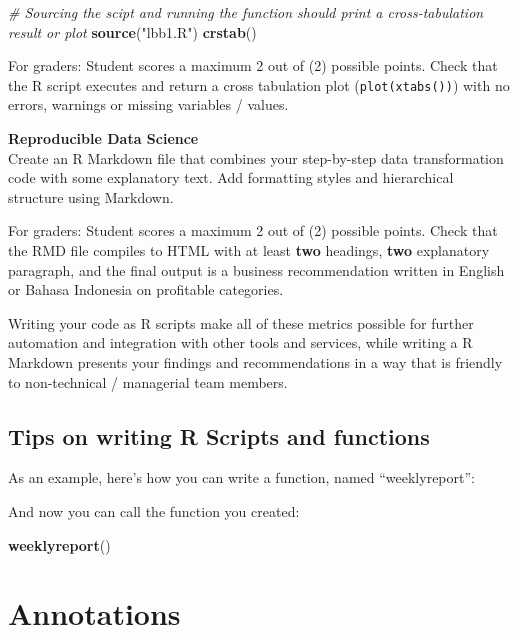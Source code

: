\documentclass[]{article}
\newenvironment{Shaded}{\begin{snugshade}}{\end{snugshade}}
\newcommand{\CommentTok}[1]{\textcolor[rgb]{0.56,0.35,0.01}{\textit{#1}}}
\newcommand{\ControlFlowTok}[1]{\textcolor[rgb]{0.13,0.29,0.53}{\textbf{#1}}}
\newcommand{\KeywordTok}[1]{\textcolor[rgb]{0.13,0.29,0.53}{\textbf{#1}}}
\newcommand{\NormalTok}[1]{#1}
\newcommand{\OperatorTok}[1]{\textcolor[rgb]{0.81,0.36,0.00}{\textbf{#1}}}
\newcommand{\StringTok}[1]{\textcolor[rgb]{0.31,0.60,0.02}{#1}}
\begin{document}
\begin{Shaded}
\begin{Highlighting}[]
\CommentTok{# Sourcing the scipt and running the function should print a cross-tabulation result or plot}
\KeywordTok{source}\NormalTok{(}\StringTok{"lbb1.R"}\NormalTok{)}
\KeywordTok{crstab}\NormalTok{()}
\end{Highlighting}
\end{Shaded}

For graders: Student scores a maximum 2 out of (2) possible points.
Check that the R script executes and return a cross tabulation plot
(\texttt{plot(xtabs())}) with no errors, warnings or missing variables /
values.

\textbf{Reproducible Data Science}\\
Create an R Markdown file that combines your step-by-step data
transformation code with some explanatory text. Add formatting styles
and hierarchical structure using Markdown.

For graders: Student scores a maximum 2 out of (2) possible points.
Check that the RMD file compiles to HTML with at least \textbf{two}
headings, \textbf{two} explanatory paragraph, and the final output is a
business recommendation written in English or Bahasa Indonesia on
profitable categories.

Writing your code as R scripts make all of these metrics possible for
further automation and integration with other tools and services, while
writing a R Markdown presents your findings and recommendations in a way
that is friendly to non-technical / managerial team members.

\hypertarget{tips-on-writing-r-scripts-and-functions}{%
\subsection{Tips on writing R Scripts and
functions}\label{tips-on-writing-r-scripts-and-functions}}

As an example, here's how you can write a function, named
``weeklyreport'':

\begin{Shaded}
\end{Shaded}

And now you can call the function you created:

\begin{Shaded}
\begin{Highlighting}[]
\KeywordTok{weeklyreport}\NormalTok{()}
\end{Highlighting}
\end{Shaded}

\hypertarget{annotations}{%
\section{Annotations}\label{annotations}}
\end{document}

